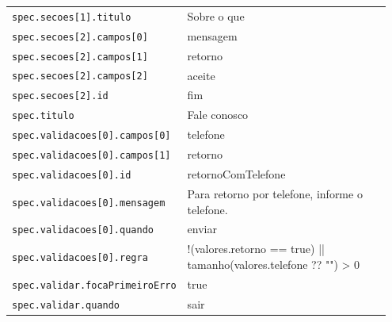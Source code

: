 \begin{tabular}{@{}p{0.35\linewidth}p{0.6\linewidth}@{}}
\texttt{spec.secoes[1].titulo} & Sobre o que \\
\texttt{spec.secoes[2].campos[0]} & mensagem \\
\texttt{spec.secoes[2].campos[1]} & retorno \\
\texttt{spec.secoes[2].campos[2]} & aceite \\
\texttt{spec.secoes[2].id} & fim \\
\texttt{spec.titulo} & Fale conosco \\
\texttt{spec.validacoes[0].campos[0]} & telefone \\
\texttt{spec.validacoes[0].campos[1]} & retorno \\
\texttt{spec.validacoes[0].id} & retornoComTelefone \\
\texttt{spec.validacoes[0].mensagem} & Para retorno por telefone, informe o telefone. \\
\texttt{spec.validacoes[0].quando} & enviar \\
\texttt{spec.validacoes[0].regra} & !(valores.retorno == true) || tamanho(valores.telefone ?? "") > 0 \\
\texttt{spec.validar.focaPrimeiroErro} & true \\
\texttt{spec.validar.quando} & sair \\
\end{tabular}
